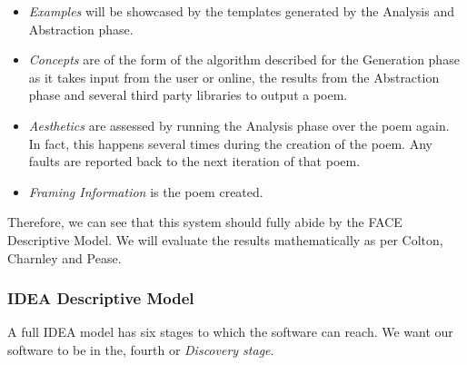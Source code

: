 \begin{itemize}
\setlength{\itemsep}{0pt}
\item{\emph{Examples} will be showcased by the templates generated by the Analysis and Abstraction phase.}
\item{\emph{Concepts} are of the form of the algorithm described for the Generation phase as it takes input from the user or online, the results from the Abstraction phase and several third party libraries to output a poem.}
\item{\emph{Aesthetics} are assessed by running the Analysis phase over the poem again. In fact, this happens several times during the creation of the poem. Any faults are reported back to the next iteration of that poem.}
\item{\emph{Framing Information} is the poem created.}
\end{itemize}

Therefore, we can see that this system should fully abide by the FACE Descriptive Model. We will evaluate the results mathematically as per Colton, Charnley and Pease.

\subsubsection{IDEA Descriptive Model}
\label{sec:idea}
A full IDEA model has six stages to which the software can reach. We want our software to be in the, fourth or \emph{Discovery stage}.

